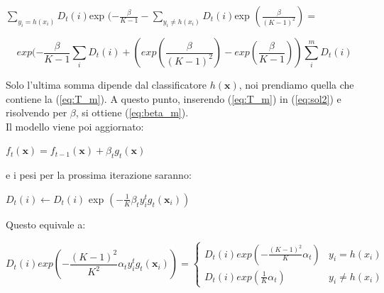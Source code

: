 \begin{center}
\begin{math}
 \sum_{y_i=h(x_i)}D_t(i)\end{math}exp
\begin{math}(-\frac{\beta}{K-1} - \sum_{y_i\ne h(x_i)}D_t(i)\end{math}exp
\begin{math}(\frac{\beta}{(K-1)^2})=
\end{math}                                                                      
\end{center}
\begin{center}
\begin{equation}\label{eq:sol3}
 exp(-\frac{\beta}{K-1}\sum_i D_t(i) + (exp
(\frac{\beta}{(K-1)^2}) - exp
(\frac{\beta}{K-1}))\sum_i^m D_t(i)
\end{equation}                                                                      
\end{center}
Solo l'ultima somma dipende dal classificatore \begin{math}h(\textbf{x})\end{math}, 
noi prendiamo quella che contiene la (\ref{eq:T_m}). 
A questo punto, inserendo (\ref{eq:T_m}) in (\ref{eq:sol2}) e risolvendo per \begin{math}
                                 \beta
                                \end{math}, si ottiene (\ref{eq:beta_m}).\\
\newline
Il modello viene poi aggiornato:
\begin{center}
\begin{math}
 f_t(\textbf{x}) = f_{t-1}(\textbf{x}) + \beta_t g_t(\textbf{x})
\end{math}                                                                      
\end{center}
e i pesi per la prossima iterazione saranno:
\begin{center}
\begin{math}
 D_t(i) \leftarrow D_t(i)\end{math} exp
 \begin{math}(-\frac{1}{K}\beta_t y_i^tg_t(\textbf{x}_i)) \end{math}                                                                   
\end{center}
Questo equivale a:
\begin{center}
\begin{equation}\label{eq:finale}
 D_t(i) exp(-\frac{(K-1)^2}{K^2} \alpha_t y_i^t g_t(\textbf{x}_i) )
= \begin{cases}D_t(i) exp(-\frac{(K-1)^2}{K} \alpha_t) & y_i=h(x_i)\\
  D_t(i) exp(\frac{1}{K}\alpha_t) & y_i\ne h(x_i) 
  \end{cases}
\end{equation}                                                                      
\end{center}
